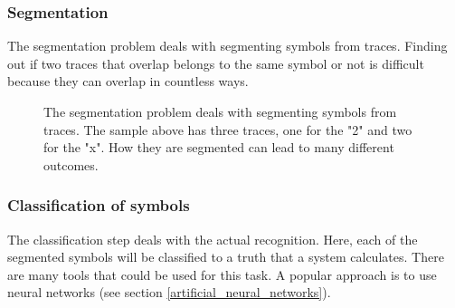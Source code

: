 \label{scale_linear_by_column}

\subsubsection{Segmentation} \label{Segmentation}
The segmentation problem deals with segmenting symbols from traces. Finding out if two traces that overlap belongs to the same symbol or not is difficult because they can overlap in countless ways. 

\begin{figure}[H]
\centering
{}
\caption{The segmentation problem deals with segmenting symbols from traces. The sample above has three traces, one for the "2"  and two for the "x". How they are segmented can lead to many different outcomes.}
\label{fig:segmentation}
\end{figure}

\subsubsection{Classification of symbols}
The classification step deals with the actual recognition. Here, each of the segmented symbols will be classified to a truth that a system calculates. There are many tools that could be used for this task. A popular approach is to use neural networks (see section \ref{artificial_neural_networks}).


